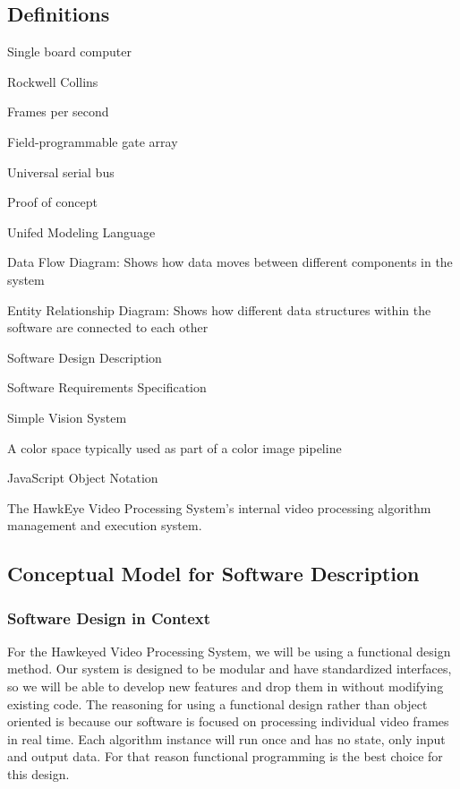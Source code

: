 \subsection{Definitions}
\begin{description}[leftmargin=2cm,labelindent=2cm]
	\item [SBC] Single board computer
	\item [RC] Rockwell Collins
	\item [FPS] Frames per second
	\item [FPGA] Field-programmable gate array
	\item [USB] Universal serial bus
	\item [PoC] Proof of concept
	\item [UML] Unifed Modeling Language
	\item [DFD] Data Flow Diagram: Shows how data moves between different components in the system
	\item [ER Diagram] Entity Relationship Diagram: Shows how different data structures within the software are connected to each other
	\item [SDD] Software Design Description
	\item [SRS] Software Requirements Specification
	\item [SVS] Simple Vision System
	\item [YUV] A color space typically used as part of a color image pipeline
	\item [JSON] JavaScript Object Notation
	\item [Modular Video Processing System] The HawkEye Video Processing System's internal video processing algorithm management and execution system.\\
\end{description}

\subsection{Conceptual Model for Software Description}
\subsubsection{Software Design in Context}
For the Hawkeyed Video Processing System, we will be using a functional design method. Our
system is designed to be modular and have standardized interfaces, so we will be able to develop new
features and drop them in without modifying existing code. The reasoning for using a functional design
rather than object oriented is because our software is focused on processing individual video frames in
real time. Each algorithm instance will run once and has no state, only input and output data. For that
reason functional programming is the best choice for this design.\\

